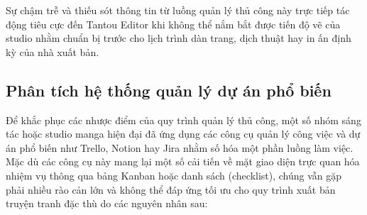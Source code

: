 Sự chậm trễ và thiếu sót thông tin từ luồng quản lý thủ công này trực tiếp tác động tiêu cực đến Tantou Editor khi không thể nắm bắt được tiến độ vẽ của studio nhằm chuẩn bị trước cho lịch trình dàn trang, dịch thuật hay in ấn định kỳ của nhà xuất bản.

\subsection{Phân tích hệ thống quản lý dự án phổ biến}
\label{subsec:cong_cu_pho_bien}
Để khắc phục các nhược điểm của quy trình quản lý thủ công, một số nhóm sáng tác hoặc studio manga hiện đại đã ứng dụng các công cụ quản lý công việc và dự án phổ biến như Trello, Notion hay Jira nhằm số hóa một phần luồng làm việc. Mặc dù các công cụ này mang lại một số cải tiến về mặt giao diện trực quan hóa nhiệm vụ thông qua bảng Kanban hoặc danh sách (checklist), chúng vẫn gặp phải nhiều rào cản lớn và không thể đáp ứng tối ưu cho quy trình xuất bản truyện tranh đặc thù do các nguyên nhân sau:
